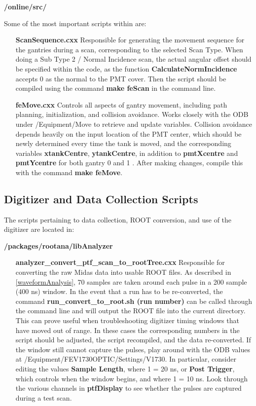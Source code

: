 \documentclass[twoside,letterpaper]{refart}
\begin{document}
\textbf{/online/src/}

Some of the most important scripts within are:

\begin{itemize}
	\item [\textbf{ScanSequence.cxx}] Responsible for generating the movement sequence for the gantries during a scan, corresponding to the selected Scan Type. When doing a Sub Type 2 / Normal Incidence scan, the actual angular offset should be specified within the code, as the function \textbf{CalculateNormIncidence} accepts 0 as the normal to the PMT cover. Then the script should be compiled using the command \textbf{make feScan} in the command line.
	\item [\textbf{feMove.cxx}] Controls all aspects of gantry movement, including path planning, initialization, and collision avoidance. Works closely with the ODB under /Equipment/Move to retrieve and update variables. Collision avoidance depends heavily on the input location of the PMT center, which should be newly determined every time the tank is moved, and the corresponding variables \textbf{xtankCentre}, \textbf{ytankCentre}, in addition to \textbf{pmtXcentre} and \textbf{pmtYcentre} for both gantry 0 and 1 . After making changes, compile this with the command \textbf{make feMove}. 
\end{itemize}

\subsection{Digitizer and Data Collection Scripts} \label{dataScripts}

The scripts pertaining to data collection, ROOT conversion, and use of the digitizer are located in:

\textbf{/packages/rootana/libAnalyzer}

\begin{itemize}
	\item [\textbf{analyzer\_convert\_ptf\_scan\_to\_rootTree.cxx}] Responsible for converting the raw Midas data into usable ROOT files. As described in \ref{waveformAnalysis}, 70 samples are taken around each pulse in a 200 sample (400 ns) window. In the event that a run has to be re-converted, the command \textbf{run\_convert\_to\_root.sh (run number)} can be called through the command line and will output the ROOT file into the current directory. This can prove useful when troubleshooting digitizer timing windows that have moved out of range. In these cases the corresponding numbers in the script should be adjusted, the script recompiled, and the data re-converted. If the window still cannot capture the pulses, play around with the ODB values at /Equipment/FEV1730OPTIC/Settings/V1730. In particular, consider editing the values \textbf{Sample Length}, where 1 = 20 ns, or \textbf{Post Trigger}, which controls when the window begins, and where 1 = 10 ns. Look through the various channels in \textbf{ptfDisplay} to see whether the pulses are captured during a test scan.

\end{itemize}
\end{document}
